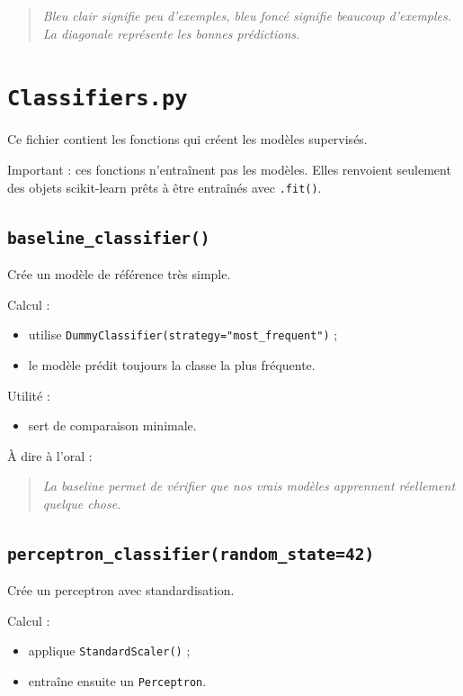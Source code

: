 \documentclass[11pt,a4paper]{article}
\begin{document}
\begin{quote}
\itshape Bleu clair signifie peu d'exemples, bleu foncé signifie beaucoup d'exemples. La diagonale représente les bonnes prédictions.
\end{quote}

\section{\texttt{Classifiers.py}}

Ce fichier contient les fonctions qui créent les modèles supervisés.

Important : ces fonctions n'entraînent pas les modèles. Elles renvoient seulement des objets scikit-learn prêts à être entraînés avec \texttt{.fit()}.

\subsection{\texttt{baseline\_classifier()}}

Crée un modèle de référence très simple.

Calcul :

\begin{itemize}
\item utilise \texttt{DummyClassifier(strategy="most\_frequent")} ;
\item le modèle prédit toujours la classe la plus fréquente.
\end{itemize}

Utilité :

\begin{itemize}
\item sert de comparaison minimale.
\end{itemize}

À dire à l'oral :

\begin{quote}
\itshape La baseline permet de vérifier que nos vrais modèles apprennent réellement quelque chose.
\end{quote}

\subsection{\texttt{perceptron\_classifier(random\_state=42)}}

Crée un perceptron avec standardisation.

Calcul :

\begin{itemize}
\item applique \texttt{StandardScaler()} ;
\item entraîne ensuite un \texttt{Perceptron}.
\end{itemize}
\end{document}

